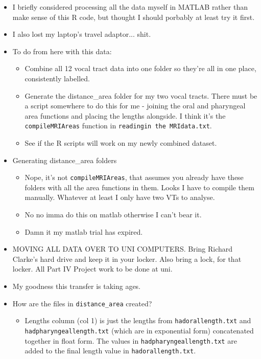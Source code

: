 \documentclass{article}
\begin{document}
\begin{itemize}
\begin{itemize}
    \end{itemize}
    \item I briefly considered processing all the data myself in MATLAB rather than make sense of this R code, but thought I should porbably at least try it first.
    \item I also lost my laptop's travel adaptor... shit.
    \item To do from here with this data:
    \begin{itemize}
        \item Combine all 12 vocal tract data into one folder so they're all in one place, consistently labelled.
        \item Generate the distance\_area folder for my two vocal tracts. There must be a script somewhere to do this for me - joining the oral and pharyngeal area functions and placing the lengths alongside. I think it's the \verb|compileMRIAreas| function in \verb|readingin the MRIdata.txt|.
        \item See if the R scripts will work on my newly combined dataset.
    \end{itemize}
    \item Generating distance\_area folders
    \begin{itemize}
        \item Nope, it's not \verb|compileMRIAreas|, that assumes you already have these folders with all the area functions in them. Looks I have to compile them manually. Whatever at least I only have two VTs to analyse.
        \item No no imma do this on matlab otherwise I can't bear it.
        \item Damn it my matlab trial has expired.
    \end{itemize}
    \item MOVING ALL DATA OVER TO UNI COMPUTERS. Bring Richard Clarke's hard drive and keep it in your locker. Also bring a lock, for that locker. All Part IV Project work to be done at uni.
    \item My goodness this transfer is taking ages. 
    \item How are the files in \verb|distance_area| created?
    \begin{itemize}
        \item Lengths column (col 1) is just the lengths from \verb|hadorallength.txt| and \verb|hadpharyngeallength.txt| (which are in exponential form) concatenated together in float form. The values in \verb|hadpharyngeallength.txt| are added to the final length value in \verb|hadorallength.txt|.

\end{itemize}
\end{itemize}
\end{document}
